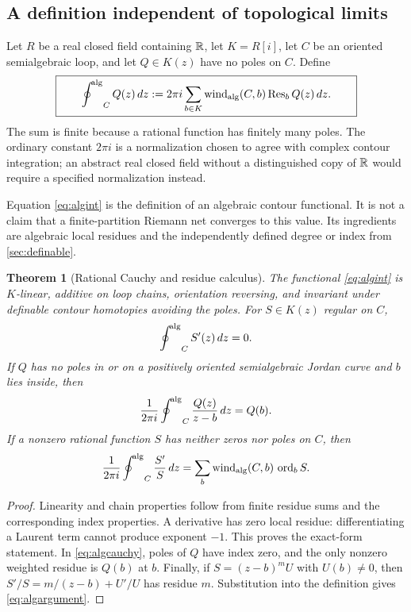 \documentclass[11pt,letterpaper]{article}
\newtheorem{theorem}{Theorem}[section]
\theoremstyle{definition}
\theoremstyle{remark}
\newcommand{\Res}{\operatorname{Res}}\newcommand{\res}{\operatorname{res}}\newcommand{\ord}{\operatorname{ord}}\newcommand{\Tr}{\operatorname{Tr}}
\newcommand{\wind}{\operatorname{wind}}\newcommand{\Ind}{\operatorname{Ind}}\newcommand{\id}{\operatorname{id}}
\numberwithin{equation}{section}
\begin{document}
\subsection{A definition independent of topological limits}
Let $R$ be a real closed field containing $\mathbb R$, let $K=R[i]$, let $C$ be an oriented semialgebraic loop, and let $Q\in K(z)$ have no poles on $C$. Define
\begin{equation}\label{eq:algint}
 \boxed{\qquad
 \ACoint_C Q(z)\,dz
   :=2\pi i\sum_{b\in K}
           \wind_{\mathrm{alg}}(C,b)\Res_b Q(z)\,dz.
 \qquad}
\end{equation}
The sum is finite because a rational function has finitely many poles. The ordinary constant $2\pi i$ is a normalization chosen to agree with complex contour integration; an abstract real closed field without a distinguished copy of $\mathbb R$ would require a specified normalization instead.

Equation \eqref{eq:algint} is the definition of an algebraic contour functional. It is not a claim that a finite-partition Riemann net converges to this value. Its ingredients are algebraic local residues and the independently defined degree or index from \cref{sec:definable}.

\begin{theorem}[Rational Cauchy and residue calculus]\label{thm:algrational}
The functional \eqref{eq:algint} is $K$-linear, additive on loop chains, orientation reversing, and invariant under definable contour homotopies avoiding the poles. For $S\in K(z)$ regular on $C$,
\[
 \mathop{\oint^{\!\mathrm{alg}}}\nolimits_C S'(z)\,dz=0.
\]
If $Q$ has no poles in or on a positively oriented semialgebraic Jordan curve and $b$ lies inside, then
\begin{equation}\label{eq:algcauchy}
 \frac1{2\pi i}\mathop{\oint^{\!\mathrm{alg}}}\nolimits_C\frac{Q(z)}{z-b}\,dz=Q(b).
\end{equation}
If a nonzero rational function $S$ has neither zeros nor poles on $C$, then
\begin{equation}\label{eq:algargument}
 \frac1{2\pi i}\ACoint_C\frac{S'}S\,dz
   =\sum_b\wind_{\mathrm{alg}}(C,b)\,\ord_bS.
\end{equation}
\end{theorem}
\begin{proof}
Linearity and chain properties follow from finite residue sums and the corresponding index properties. A derivative has zero local residue: differentiating a Laurent term cannot produce exponent $-1$. This proves the exact-form statement. In \eqref{eq:algcauchy}, poles of $Q$ have index zero, and the only nonzero weighted residue is $Q(b)$ at $b$. Finally, if $S=(z-b)^m U$ with $U(b)\ne0$, then $S'/S=m/(z-b)+U'/U$ has residue $m$. Substitution into the definition gives \eqref{eq:algargument}.
\end{proof}
\end{document}
